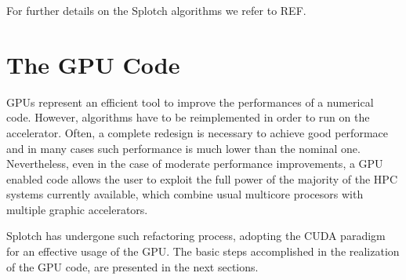 \documentclass[11pt]{article}
\begin{document}
For further details on the Splotch algorithms we refer to REF.

\section{The GPU Code}

GPUs represent an efficient tool to improve the performances of a numerical code.
However, algorithms have to be reimplemented in order to run on the accelerator. 
Often, a complete redesign is necessary to achieve good performace and in many
cases such performance is much lower than the nominal one. Nevertheless, even in 
the case of moderate performance improvements, a GPU enabled code allows the 
user to exploit the full power of the majority of the HPC systems currently 
available, which combine usual multicore procesors with multiple graphic accelerators.

Splotch has undergone such refactoring process, adopting the CUDA paradigm 
for an effective usage of the GPU. The basic steps accomplished in
the realization of the GPU code, are presented in the next sections. 

%
\end{document}
